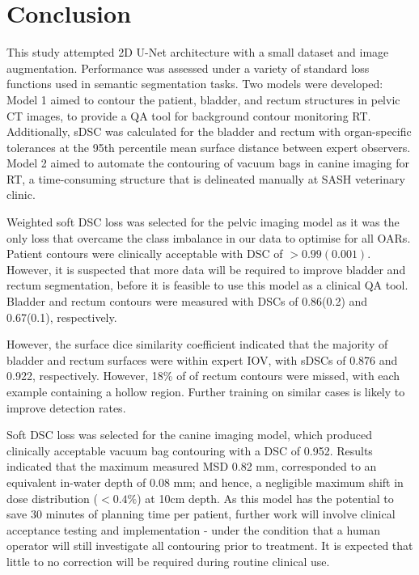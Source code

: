 \chapter{Conclusion}
\label{ch:conclusion}

This study attempted 2D U-Net architecture with a small dataset and image augmentation. Performance was assessed under a variety of standard loss functions used in semantic segmentation tasks. Two models were developed: Model 1 aimed to contour the patient, bladder, and rectum structures in pelvic CT images, to provide a QA tool for background contour monitoring RT. Additionally, sDSC was calculated for the bladder and rectum with organ-specific tolerances at the 95th percentile mean surface distance between expert observers. Model 2 aimed to automate the contouring of vacuum bags in canine imaging for RT, a time-consuming structure that is delineated manually at SASH veterinary clinic.

Weighted soft DSC loss was selected for the pelvic imaging model as it was the only loss that overcame the class imbalance in our data to optimise for all OARs. Patient contours were clinically acceptable with DSC of $>0.99(0.001)$. However, it is suspected that more data will be required to improve bladder and rectum segmentation, before it is feasible to use this model as a clinical QA tool. Bladder and rectum contours were measured with DSCs of 0.86(0.2) and 0.67(0.1), respectively.

However, the surface dice similarity coefficient indicated that the majority of bladder and rectum surfaces were within expert IOV, with sDSCs of 0.876 and 0.922, respectively. However, 18\% of of rectum contours were missed, with each example containing a hollow region. Further training on similar cases is likely to improve detection rates.

Soft DSC loss was selected for the canine imaging model, which produced clinically 
acceptable vacuum bag contouring with a DSC of 0.952. Results indicated that the maximum measured MSD  0.82 mm, corresponded to an equivalent in-water depth of 0.08 mm; and hence, a negligible maximum shift in dose distribution ($<0.4\%$) at 10cm depth. As this model has the potential to save 30 minutes of planning time per patient, further work will involve clinical acceptance testing and implementation - under the condition that a human operator will still investigate all contouring prior to treatment. It is expected that little to no correction will be required during routine clinical use.


